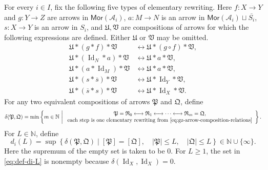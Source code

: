 \documentclass[10pt,a4paper]{amsart}
\theoremstyle{plain}
\theoremstyle{definition}
\theoremstyle{remark}
\begin{document}
For every $i\in I$, fix the following five types of elementary rewriting.
Here $f:X\longrightarrow Y$ and $g:Y\longrightarrow Z$ are arrows in $\mathsf{Mor}(\mathcal A_i)$, $a:M\longrightarrow N$ is an arrow in $\mathsf{Mor}(\mathcal A_i)\sqcup\overline{S_i}$, $s:X\longrightarrow Y$ is an arrow in $S_i$, and $\mathfrak U,\mathfrak V$ are compositions of arrows for which the following expressions are defined.
Either $\mathfrak U$ or $\mathfrak V$ may be omitted.
\begin{equation}\label{eq:gz-arrow-composition-relations}
  \begin{aligned}
    \mathfrak U\ast(g\ast f)\ast\mathfrak V
     & \longleftrightarrow
    \mathfrak U\ast(g\circ f)\ast\mathfrak V,          \\
    \mathfrak U\ast(\operatorname{Id}_N\ast a)\ast\mathfrak V
     & \longleftrightarrow
    \mathfrak U\ast a\ast\mathfrak V,                  \\
    \mathfrak U\ast(a\ast\operatorname{Id}_M)\ast\mathfrak V
     & \longleftrightarrow
    \mathfrak U\ast a\ast\mathfrak V,                  \\
    \mathfrak U\ast(s\ast\overline s)\ast\mathfrak V
     & \longleftrightarrow
    \mathfrak U\ast\operatorname{Id}_Y\ast\mathfrak V, \\
    \mathfrak U\ast(\overline s\ast s)\ast\mathfrak V
     & \longleftrightarrow
    \mathfrak U\ast\operatorname{Id}_X\ast\mathfrak V.
  \end{aligned}
\end{equation}
For any two equivalent compositions of arrows $\mathfrak P$ and $\mathfrak Q$, define
\[
  \delta(\mathfrak P,\mathfrak Q)
  =
  \min\left\{
  m\in\mathbb N\ \middle|\
  \begin{array}{c}
    \mathfrak P=\mathfrak R_0
    \longleftrightarrow\mathfrak R_1
    \longleftrightarrow\cdots
    \longleftrightarrow\mathfrak R_m=\mathfrak Q, \\
    \text{each step is one elementary rewriting from \eqref{eq:gz-arrow-composition-relations}}
  \end{array}
  \right\}.
\]
For $L\in\mathbb N$, define
\begin{equation}\label{eq:def-di-L}
  d_i(L) = \sup\left\{ \delta(\mathfrak P,\mathfrak Q) \mid [\mathfrak P]=[\mathfrak Q],\quad |\mathfrak P|\leq L,\quad|\mathfrak Q|\leq L \right\} \in\mathbb N\cup\{\infty\}.
\end{equation}
Here the supremum of the empty set is taken to be $0$.
For $L\geq1$, the set in \eqref{eq:def-di-L} is nonempty because $\delta(\operatorname{Id}_X,\operatorname{Id}_X)=0$.
\end{document}
